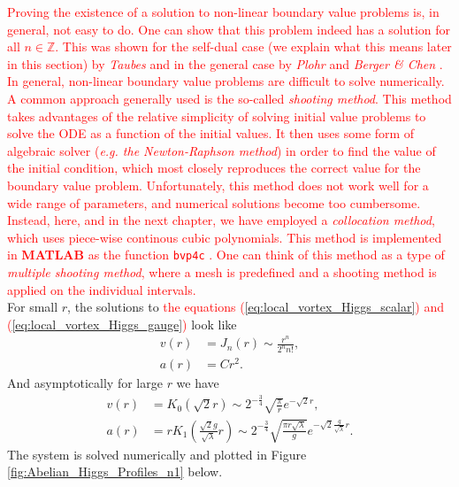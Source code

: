     \textcolor{red}{Proving the existence of a solution to non-linear boundary value problems is, in general, not easy to do. One can show that this problem indeed has a solution for all $n\in \mathbb{Z}$. This was shown for the self-dual case (we explain what this means later in this section) by \textit{Taubes} \cite{Taubes1980_1, Taubes1980_2}  and in the general case by \textit{Plohr} and \textit{Berger \& Chen} \cite{Plohr1981, Berger1989}. In general, non-linear boundary value problems are difficult to solve numerically. A common approach generally used is the so-called \textit{shooting method}. This method takes advantages of the relative simplicity of solving initial value problems to solve the ODE as a function of the initial values. It then uses some form of algebraic solver (\textit{e.g. the Newton-Raphson method}) in order to find the value of the initial condition, which most closely reproduces the correct value for the boundary value problem. Unfortunately, this method does not work well for a wide range of parameters, and numerical solutions become too cumbersome. Instead, here, and in the next chapter, we have employed a \textit{collocation method}, which uses piece-wise continous cubic polynomials. This method is implemented in \textbf{MATLAB} as the function \texttt{bvp4c} \cite{Kierzenka2001}. One can think of this method as a type of \textit{multiple shooting method}, where a mesh is predefined and a shooting method is applied on the individual intervals. }\\
    \indent For small $r$, the solutions to \textcolor{red}{the equations (\ref{eq:local_vortex_Higgs_scalar}) and (\ref{eq:local_vortex_Higgs_gauge})} look like
    \begin{align}
        v(r)&= J_n(r) \sim \frac{r^n}{ 2^n n!}, \\
        a(r)&= C r^2.
    \end{align}
    And asymptotically for large $r$ we have
    \begin{align}
        v(r)&=K_0\left(\sqrt{2} r\right)\sim 2^{-\frac{3}{4}}\sqrt{\frac{\pi}{r}} e^{- \sqrt{2} r} , \label{eq:Asymptotics1_Abelian_Higgs} \\
        a(r)&=r K_1\left(\frac{\sqrt{2} g}{\sqrt{\lambda}} r \right)\sim 2^{- \frac{3}{4}} \sqrt{\frac{\pi r \sqrt{\lambda}}{g}} e^{- \sqrt{2} \frac{g}{\sqrt{\lambda}}r}. \label{eq:Asymptotics2_Abelian_Higgs}
    \end{align}
    The system is solved numerically and plotted in Figure \ref{fig:Abelian_Higgs_Profiles_n1} below.
